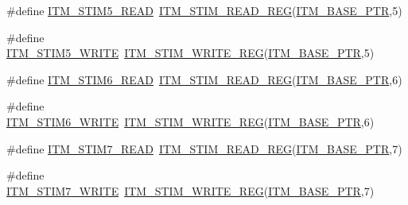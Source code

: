 \begin{DoxyCompactItemize}
\item 
\#define \hyperlink{group___i_t_m___register___accessor___macros_ga71729386b6675413e54bbae85ca5f6b4}{I\+T\+M\+\_\+\+S\+T\+I\+M5\+\_\+\+R\+E\+AD}~\hyperlink{group___i_t_m___register___accessor___macros_ga5009882336aadcd4f37b45cf3395c450}{I\+T\+M\+\_\+\+S\+T\+I\+M\+\_\+\+R\+E\+A\+D\+\_\+\+R\+EG}(\hyperlink{group___i_t_m___peripheral_gafaddee8fe8b6a898d4e5edc43ee0d703}{I\+T\+M\+\_\+\+B\+A\+S\+E\+\_\+\+P\+TR},5)
\item 
\#define \hyperlink{group___i_t_m___register___accessor___macros_ga07b231bcf27e2a69fe3168aa387fc4b7}{I\+T\+M\+\_\+\+S\+T\+I\+M5\+\_\+\+W\+R\+I\+TE}~\hyperlink{group___i_t_m___register___accessor___macros_ga049ca92a4e78e77c19af81e51aa73f1c}{I\+T\+M\+\_\+\+S\+T\+I\+M\+\_\+\+W\+R\+I\+T\+E\+\_\+\+R\+EG}(\hyperlink{group___i_t_m___peripheral_gafaddee8fe8b6a898d4e5edc43ee0d703}{I\+T\+M\+\_\+\+B\+A\+S\+E\+\_\+\+P\+TR},5)
\item 
\#define \hyperlink{group___i_t_m___register___accessor___macros_ga8a39db72396c8cd021762dbe2def218c}{I\+T\+M\+\_\+\+S\+T\+I\+M6\+\_\+\+R\+E\+AD}~\hyperlink{group___i_t_m___register___accessor___macros_ga5009882336aadcd4f37b45cf3395c450}{I\+T\+M\+\_\+\+S\+T\+I\+M\+\_\+\+R\+E\+A\+D\+\_\+\+R\+EG}(\hyperlink{group___i_t_m___peripheral_gafaddee8fe8b6a898d4e5edc43ee0d703}{I\+T\+M\+\_\+\+B\+A\+S\+E\+\_\+\+P\+TR},6)
\item 
\#define \hyperlink{group___i_t_m___register___accessor___macros_gab5f100af2978bf54186d5754e9676f5d}{I\+T\+M\+\_\+\+S\+T\+I\+M6\+\_\+\+W\+R\+I\+TE}~\hyperlink{group___i_t_m___register___accessor___macros_ga049ca92a4e78e77c19af81e51aa73f1c}{I\+T\+M\+\_\+\+S\+T\+I\+M\+\_\+\+W\+R\+I\+T\+E\+\_\+\+R\+EG}(\hyperlink{group___i_t_m___peripheral_gafaddee8fe8b6a898d4e5edc43ee0d703}{I\+T\+M\+\_\+\+B\+A\+S\+E\+\_\+\+P\+TR},6)
\item 
\#define \hyperlink{group___i_t_m___register___accessor___macros_gad3fb2b38ef6a9727bd3036cf014f3d61}{I\+T\+M\+\_\+\+S\+T\+I\+M7\+\_\+\+R\+E\+AD}~\hyperlink{group___i_t_m___register___accessor___macros_ga5009882336aadcd4f37b45cf3395c450}{I\+T\+M\+\_\+\+S\+T\+I\+M\+\_\+\+R\+E\+A\+D\+\_\+\+R\+EG}(\hyperlink{group___i_t_m___peripheral_gafaddee8fe8b6a898d4e5edc43ee0d703}{I\+T\+M\+\_\+\+B\+A\+S\+E\+\_\+\+P\+TR},7)
\item 
\#define \hyperlink{group___i_t_m___register___accessor___macros_ga5a34eadd8072ebc43f50398cb76171af}{I\+T\+M\+\_\+\+S\+T\+I\+M7\+\_\+\+W\+R\+I\+TE}~\hyperlink{group___i_t_m___register___accessor___macros_ga049ca92a4e78e77c19af81e51aa73f1c}{I\+T\+M\+\_\+\+S\+T\+I\+M\+\_\+\+W\+R\+I\+T\+E\+\_\+\+R\+EG}(\hyperlink{group___i_t_m___peripheral_gafaddee8fe8b6a898d4e5edc43ee0d703}{I\+T\+M\+\_\+\+B\+A\+S\+E\+\_\+\+P\+TR},7)

\end{DoxyCompactItemize}
